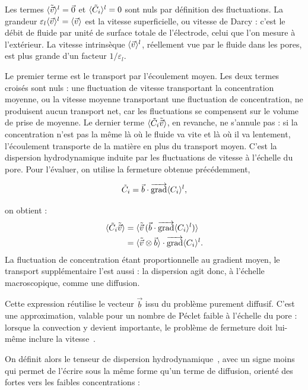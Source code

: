 Les termes $\langle \tilde{\vec{v}} \rangle^l = \vec{0}$ et $\langle \tilde{C}_i \rangle^l = 0$
sont nuls par définition des fluctuations. La grandeur
$\varepsilon_l\langle \vec{v} \rangle^l = \langle \vec{v} \rangle$ est la vitesse superficielle,
ou vitesse de Darcy : c'est le débit de fluide par unité de surface totale de
l'électrode, celui que l'on mesure à l'extérieur. La vitesse intrinsèque
$\langle \vec{v} \rangle^l$, réellement vue par le fluide dans les pores, est plus grande
d'un facteur $1/\varepsilon_l$.

Le premier terme est le transport par l'écoulement moyen. Les deux termes
croisés sont nuls : une fluctuation de vitesse transportant la concentration
moyenne, ou la vitesse moyenne transportant une fluctuation de concentration,
ne produisent aucun transport net, car les fluctuations se compensent sur le
volume de prise de moyenne. Le dernier terme
$\langle \tilde{C}_i \tilde{\vec{v}} \rangle$, en revanche, ne s'annule pas : si la
concentration n'est pas la même là où le fluide va vite et là où il va
lentement, l'écoulement transporte de la matière en plus du transport moyen.
C'est la dispersion hydrodynamique induite par les fluctuations de vitesse à
l'échelle du pore. Pour l'évaluer, on utilise la fermeture obtenue
précédemment,

\begin{equation}
\tilde{C}_i
=
\vec{b} \cdot \mathop{\overrightarrow{\operatorname{grad}}}\nolimits \langle C_i \rangle^l,
\end{equation}

on obtient :
\begin{align}
\langle \tilde{C}_i \tilde{\vec{v}} \rangle
&=
\langle 
\tilde{\vec{v}} \, (\vec{b} \cdot \mathop{\overrightarrow{\operatorname{grad}}}\nolimits \langle C_i \rangle^l)
 \rangle
\notag\\
&=
\langle \tilde{\vec{v}} \otimes \vec{b} \rangle
\cdot \mathop{\overrightarrow{\operatorname{grad}}}\nolimits \langle C_i \rangle^l.
\end{align}
La fluctuation de concentration étant proportionnelle au gradient moyen, le
transport supplémentaire l'est aussi : la dispersion agit donc, à l'échelle
macroscopique, comme une diffusion.

Cette expression réutilise le vecteur $\vec{b}$ issu du problème purement diffusif.
C'est une approximation, valable pour un nombre de Péclet faible à l'échelle du pore :
lorsque la convection y devient importante, le problème de fermeture doit lui-même
inclure la vitesse~\cite{whitakerMethodVolumeAveraging1999}.

On définit alors le tenseur de dispersion hydrodynamique~\cite{whitakerMethodVolumeAveraging1999},
avec un signe moins qui permet de l'écrire sous la même forme qu'un terme de
diffusion, orienté des fortes vers les faibles concentrations :

